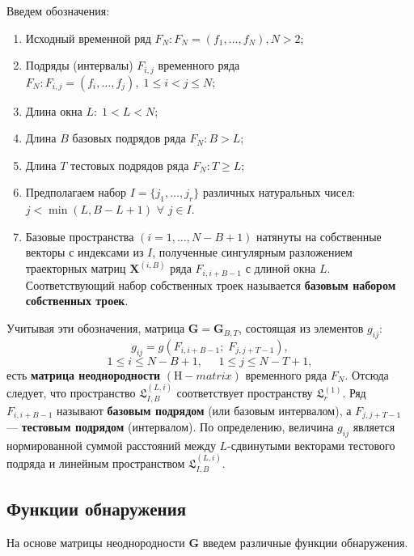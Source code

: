 \documentclass[specialist, substylefile = spbu.rtx,
			   subf, href, 12pt]{disser}
\begin{document}
Введем обозначения:
\begin{enumerate}
	
	\item
	Исходный временной ряд $ F_N: F_N = (f_1, \dotsc, f_{N}), N > 2 $;
	
	\item
	Подряды (интервалы) $ F_{i, j} $ временного ряда $ F_N: F_{i, j} = (f_{i}, \dotsc, f_{j}), \; 1 \leq i < j \leq N $;
	
	\item
	Длина окна $ L: \; 1 < L < N $;
	
	\item
	Длина $ B $ базовых подрядов ряда $ F_N: B > L $;
	
	\item
	Длина $ T $ тестовых подрядов ряда $ F_N: T \geq L $;
	
	\item
	Предполагаем набор $ I = \{j_1, \dotsc, j_r\} $ различных натуральных чисел: $ j < \min(L, B - L + 1) $ $ \forall $ $ j \in I $.
	
	\item
	Базовые пространства $ (i = 1, \dotsc, N - B + 1) $ натянуты на собственные векторы с индексами из $ I $, полученные сингулярным разложением траекторных матриц $ \mathbf{X}^{(i, B)} $ ряда $ F_{i, i+B-1} $ с длиной окна $ L $. Соответствующий набор собственных троек называется \textbf{базовым набором собственных троек}.
	
\end{enumerate}

Учитывая эти обозначения, матрица $ \mathbf{G} = \mathbf{G}_{B, T} $, состоящая из элементов $g_{ij}$:
\begin{equation} \label{eq:g_elements}
	g_{ij} = g(F_{i, i+B-1};\;F_{j, j+T-1}),
\end{equation}
$$1 \leq i \leq N-B+1,\;\;\;\;\; 1 \leq j \leq N-T+1,$$
есть \textbf{матрица неоднородности} $ (\mathrm{H}-matrix) $ временного ряда $ F_N $. Отсюда следует, что пространство $ \mathfrak{L}_{I, B}^{(L, i)} $ соответствует пространству $ \mathfrak{L}_r^{(1)} $. Ряд $ F_{i, i+B-1} $ называют \textbf{базовым подрядом} (или базовым интервалом), а $ F_{j, j+T-1} $ --- \textbf{тестовым подрядом} (интервалом). По определению, величина $g_{ij}$ является нормированной суммой расстояний между $L$-сдвинутыми векторами тестового подряда и линейным пространством $ \mathfrak{L}_{I, B}^{(L, i)} $. 

\subsection{Функции обнаружения}
На основе матрицы неоднородности $ \mathbf{G} $ введем различные функции обнаружения.
\end{document}
